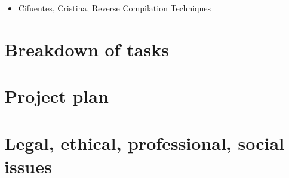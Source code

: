 \documentclass[12pt, a4paper]{article}
\begin{document}

\begin{itemize}
	\item Cifuentes, Cristina, Reverse Compilation Techniques \cite{cifuentes_reverse_comp}
\end{itemize}

\section{Breakdown of tasks}


\section{Project plan}


\section{Legal, ethical, professional, social issues}


\clearpage


\end{document}

